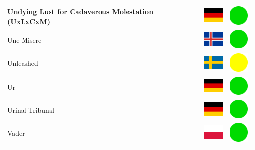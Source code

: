 \documentclass[12pt, a4paper, twoside]{report}
\begin{document}
\begin{center}
\begin{longtable}{|p{5cm}|p{2cm}|p{2cm}|}
 Undying Lust for Cadaverous Molestation (UxLxCxM)          & \includegraphics[width=1cm]{../4x3/de} &   \includegraphics[width=1cm]{../likes/y} \\ \hline
 Une Misere                                                 & \includegraphics[width=1cm]{../4x3/is} &   \includegraphics[width=1cm]{../likes/y} \\ \hline
 Unleashed                                                  & \includegraphics[width=1cm]{../4x3/se} &   \includegraphics[width=1cm]{../likes/m} \\ \hline
 Ur                                                         & \includegraphics[width=1cm]{../4x3/de} &   \includegraphics[width=1cm]{../likes/y} \\ \hline
 Urinal Tribunal                                            & \includegraphics[width=1cm]{../4x3/de} &   \includegraphics[width=1cm]{../likes/y} \\ \hline
 Vader                                                      & \includegraphics[width=1cm]{../4x3/pl} &   \includegraphics[width=1cm]{../likes/y} \\ \hline

\end{longtable}
\end{center}
\end{document}
